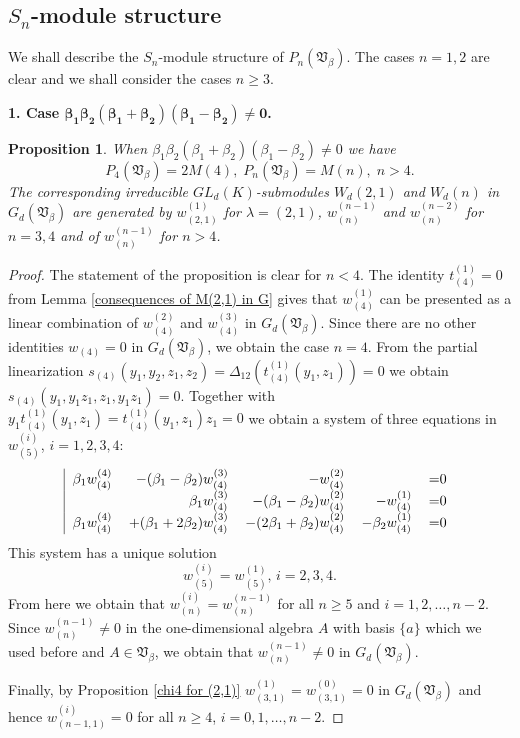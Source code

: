 \documentclass{amsart}
\newtheorem{proposition}[theorem]{Proposition}
\theoremstyle{definition}
\begin{document}
\subsection{$S_n$-module structure}
We shall describe the $S_n$-module structure of $P_n({\mathfrak V}_{\beta})$.
The cases $n=1,2$ are clear and we shall consider the cases $n\geq 3$.

{\bf 1. Case $\bm{\beta_1\beta_2(\beta_1+\beta_2)(\beta_1-\beta_2)\not=0}$.}

\begin{proposition}\label{chi for general beta}
When $\beta_1\beta_2(\beta_1+\beta_2)(\beta_1-\beta_2)\not=0$ we have
\[
P_4({\mathfrak V}_{\beta})=2M(4),\;P_n({\mathfrak V}_{\beta})=M(n),\; n> 4.
\]
The corresponding irreducible $GL_d(K)$-submodules $W_d(2,1)$ and $W_d(n)$ in $G_d({\mathfrak V}_{\beta})$ are generated by
$w_{(2,1)}^{(1)}$ for $\lambda=(2,1)$, $w_{(n)}^{(n-1)}$ and $w_{(n)}^{(n-2)}$ for $n=3,4$ and of $w_{(n)}^{(n-1)}$ for $n>4$.
\end{proposition}

\begin{proof}
The statement of the proposition is clear for $n<4$. The identity $t^{(1)}_{(4)}=0$ from Lemma \ref{consequences of M(2,1) in G}  gives that
$w_{(4)}^{(1)}$ can be presented as a linear combination of $w_{(4)}^{(2)}$ and $w_{(4)}^{(3)}$ in $G_d({\mathfrak V}_{\beta})$.
Since there are no other identities $w_{(4)}=0$ in $G_d({\mathfrak V}_{\beta})$,
we obtain the case $n=4$. From the partial linearization $s_{(4)}(y_1,y_2,z_1,z_2)=\Delta_{12}(t^{(1)}_{(4)}(y_1,z_1))=0$ we obtain
$s_{(4)}(y_1,y_1z_1,z_1,y_1z_1)=0$. Together with $y_1t^{(1)}_{(4)}(y_1,z_1)=t^{(1)}_{(4)}(y_1,z_1)z_1=0$
we obtain a system of three equations in $w^{(i)}_{(5)}$, $i=1,2,3,4$:
\[
\text{
\begin{tabular}{|rrrrl}
$\beta_1w_{(4)}^{(4)}$&$-(\beta_1-\beta_2)w_{(4)}^{(3)}$&$-w_{(4)}^{(2)}$&&=0\\
&$\beta_1w_{(4)}^{(3)}$&$-(\beta_1-\beta_2)w_{(4)}^{(2)}$&$-w_{(4)}^{(1)}$&=0\\
$\beta_1w_{(4)}^{(4)}$&$+(\beta_1+2\beta_2)w_{(4)}^{(3)}$&$-(2\beta_1+\beta_2)w_{(4)}^{(2)}$&$-\beta_2w_{(4)}^{(1)}$&=0\\
\end{tabular}
}
\]
This system has a unique solution
\[
w^{(i)}_{(5)}=w^{(1)}_{(5)},\,i=2,3,4.
\]
From here we obtain that $w^{(i)}_{(n)}=w^{(n-1)}_{(n)}$ for all $n\geq 5$ and $i=1,2,\ldots,n-2$.
Since $w^{(n-1)}_{(n)}\not=0$ in the one-dimensional algebra $A$ with basis $\{a\}$ which we used before
and $A\in{\mathfrak V}_{\beta}$, we obtain that $w^{(n-1)}_{(n)}\not=0$ in $G_d({\mathfrak V}_{\beta})$.

Finally, by Proposition \ref{chi4 for (2,1)} $w^{(1)}_{(3,1)}=w^{(0)}_{(3,1)}=0$ in $G_d({\mathfrak V}_{\beta})$
and hence $w^{(i)}_{(n-1,1)}=0$ for all $n\geq 4$, $i=0,1,\ldots,n-2$.
\end{proof}
\end{document}
